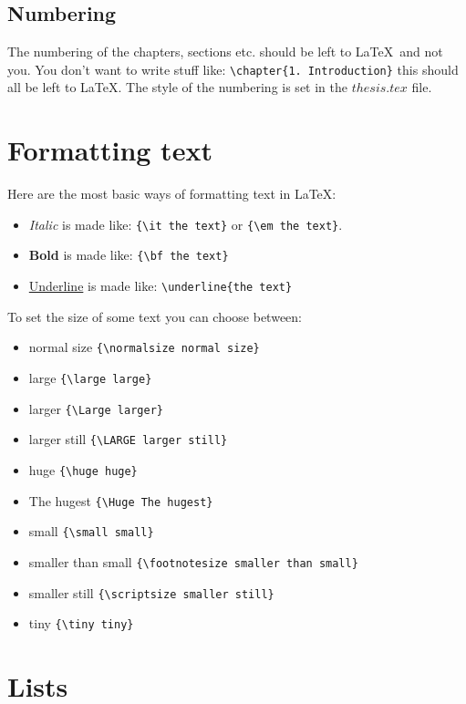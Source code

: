 \subsection{Numbering}
The numbering of the chapters, sections etc. should be left to \LaTeX\
and not you. You don't want to write stuff like:
\verb+\chapter{1. Introduction}+ this should all be left to
\LaTeX. The style of the numbering is set in the $thesis.tex$ file.

\section{Formatting text}

Here are the most basic ways of formatting text in \LaTeX:
\begin{itemize}
\item {\em Italic} is made like: \verb+{\it the text}+ or
\verb+{\em the text}+.
\item {\bf Bold} is made like: \verb+{\bf the text}+
\item \underline{Underline} is made like: \verb+\underline{the text}+
\end{itemize}

To set the size of some text you can choose between:
\begin{itemize}
\item {\normalsize normal size} \verb+{\normalsize normal size}+
\item {\large large} \verb+{\large large}+
\item {\Large larger} \verb+{\Large larger}+
\item {\LARGE larger still} \verb+{\LARGE larger still}+
\item {\huge huge} \verb+{\huge huge}+
\item {\Huge The hugest} \verb+{\Huge The hugest}+
\item {\small small} \verb+{\small small}+
\item {\footnotesize smaller than small} \verb+{\footnotesize smaller than small}+
\item {\scriptsize smaller still} \verb+{\scriptsize smaller still}+
\item {\tiny tiny} \verb+{\tiny tiny}+
\end{itemize}


\section{Lists}


